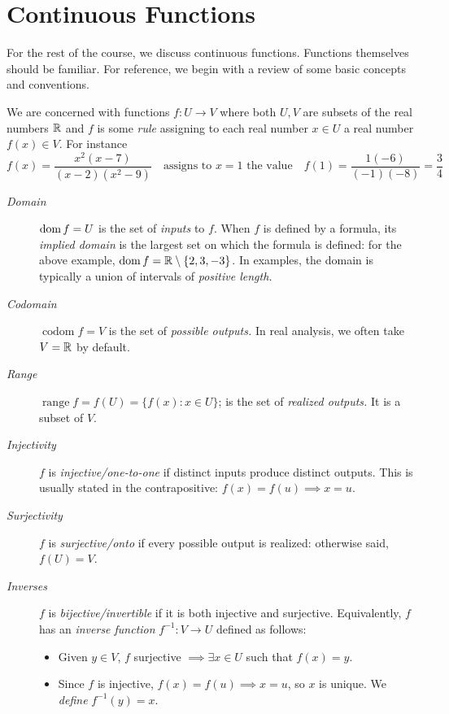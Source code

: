 \graphicspath{{4continuity/asy/}}

\setcounter{section}{16}


\section{Continuous Functions}\label{sec:cont}

For the rest of the course, we discuss continuous functions. Functions themselves should be familiar. For reference, we begin with a review of some basic concepts and conventions.\medbreak


We are concerned with functions $f:U\to V$ where both $U,V$ are subsets of the real numbers $\mathbb{R}$ and $f$ is some \emph{rule} assigning to each real number $x\in U$ a real number $f(x)\in V$. For instance
\[f(x)=\frac {x^2(x-7)}{(x-2)(x^2-9)} \quad\text{assigns to $x=1$ the value}\quad f(1)=\frac{1(-6)}{(-1)(-8)}=\frac 34\]
\begin{description}%
	\item[\normalfont\emph{Domain}] $\operatorname{dom} f=U$ is the set of \emph{inputs} to $f$. When $f$ is defined by a formula, its \emph{implied domain} is the largest set on which the formula is defined: for the above example, $\operatorname{dom} f=\mathbb{R}\setminus\{2,3,-3\}$. In examples, the domain is typically a union of intervals of \emph{positive length.}
	\item[\normalfont\emph{Codomain}] $\operatorname{codom}f=V$ is the set of \emph{possible outputs.} In real analysis, we often take $V=\mathbb{R}$ by default.
	\item[\normalfont\emph{Range}] $\operatorname{range}f=f(U)=\{f(x):x\in U\}$; is the set of \emph{realized outputs.} It is a subset of $V$.
	\item[\normalfont\emph{Injectivity}] $f$ is \emph{injective/one-to-one} if distinct inputs produce distinct outputs. This is usually stated in the contrapositive: $f(x)=f(u)\implies x=u$.
	\item[\normalfont\emph{Surjectivity}] $f$ is \emph{surjective/onto} if every possible output is realized: otherwise said, $f(U)=V$.
	\item[\normalfont\emph{Inverses}] $f$ is \emph{bijective/invertible} if it is both injective and surjective. Equivalently, $f$ has an \emph{inverse function} $f^{-1}:V\to U$ defined as follows:
	\begin{itemize}
	  \item Given $y\in V$, $f$ surjective $\implies \exists x\in U$ such that $f(x)=y$.
	  \item Since $f$ is injective, $f(x)=f(u)\implies x=u$, so $x$ is unique. We \emph{define} $f^{-1}(y)=x$. 
	\end{itemize}
\end{description}

